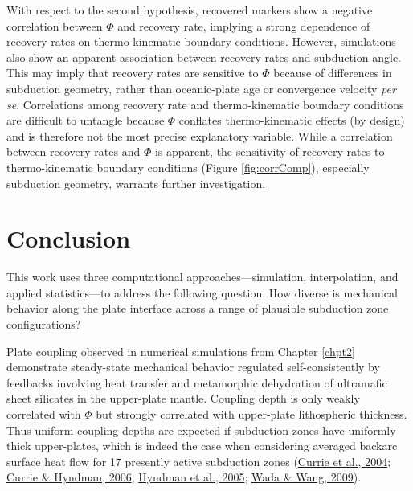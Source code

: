 With respect to the second hypothesis, recovered markers show a negative correlation between \(\Phi\) and recovery rate, implying a strong dependence of recovery rates on thermo-kinematic boundary conditions. However, simulations also show an apparent association between recovery rates and subduction angle. This may imply that recovery rates are sensitive to \(\Phi\) because of differences in subduction geometry, rather than oceanic-plate age or convergence velocity \emph{per se}. Correlations among recovery rate and thermo-kinematic boundary conditions are difficult to untangle because \(\Phi\) conflates thermo-kinematic effects (by design) and is therefore not the most precise explanatory variable. While a correlation between recovery rates and \(\Phi\) is apparent, the sensitivity of recovery rates to thermo-kinematic boundary conditions (Figure \ref{fig:corrComp}), especially subduction geometry, warrants further investigation.

\cleardoublepage

\hypertarget{chpt5}{%
\chapter{Conclusion}\label{chpt5}}


This work uses three computational approaches---simulation, interpolation, and applied statistics---to address the following question. How diverse is mechanical behavior along the plate interface across a range of plausible subduction zone configurations?

Plate coupling observed in numerical simulations from Chapter \ref{chpt2} demonstrate steady-state mechanical behavior regulated self-consistently by feedbacks involving heat transfer and metamorphic dehydration of ultramafic sheet silicates in the upper-plate mantle. Coupling depth is only weakly correlated with \(\Phi\) but strongly correlated with upper-plate lithospheric thickness. Thus uniform coupling depths are expected if subduction zones have uniformly thick upper-plates, which is indeed the case when considering averaged backarc surface heat flow for 17 presently active subduction zones (\protect\hyperlink{ref-currie2004}{Currie et al., 2004}; \protect\hyperlink{ref-currie2006}{Currie \& Hyndman, 2006}; \protect\hyperlink{ref-hyndman2005}{Hyndman et al., 2005}; \protect\hyperlink{ref-wada2009}{Wada \& Wang, 2009}).


